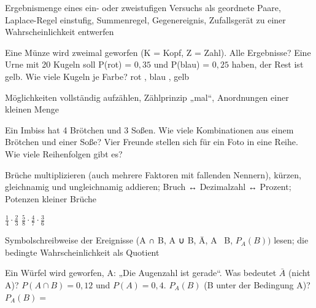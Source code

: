 \setcounter{aufgabe}{0}

\begin{aufgabe}{Ergebnismenge eines ein- oder zweistufigen Versuchs als geordnete Paare, Laplace-Regel einstufig, Summenregel, Gegenereignis, Zufallsgerät zu einer Wahrscheinlichkeit entwerfen}
\begin{teile}
\teil Eine Münze wird zweimal geworfen (K = Kopf, Z = Zahl). Alle Ergebnisse?
\teil Eine Urne mit 20 Kugeln soll P(rot) = $0{,}35$ und P(blau) = $0{,}25$ haben, der Rest ist gelb. Wie viele Kugeln je Farbe? rot \leerfeld, blau \leerfeld, gelb \leerfeld
\end{teile}
\end{aufgabe}

\begin{aufgabe}{Möglichkeiten vollständig aufzählen, Zählprinzip „mal“, Anordnungen einer kleinen Menge}
\begin{teile}
\teil Ein Imbiss hat 4 Brötchen und 3 Soßen. Wie viele Kombinationen aus einem Brötchen und einer Soße? \leerfeld
\teil Vier Freunde stellen sich für ein Foto in eine Reihe. Wie viele Reihenfolgen gibt es? \leerfeld
\end{teile}
\end{aufgabe}

\begin{aufgabe}{Brüche multiplizieren (auch mehrere Faktoren mit fallenden Nennern), kürzen, gleichnamig und ungleichnamig addieren; Bruch ↔ Dezimalzahl ↔ Prozent; Potenzen kleiner Brüche}
\begin{teile}
\teil $\frac{1}{4} \cdot \frac{2}{3}$ \leerfeld
\teil $\frac{5}{8} \cdot \frac{4}{7} \cdot \frac{3}{6}$ \leerfeld
\end{teile}
\end{aufgabe}

\begin{aufgabe}{Symbolschreibweise der Ereignisse (A ∩ B, A ∪ B, Ā, A \ B, $P_A(B))$ lesen; die bedingte Wahrscheinlichkeit als Quotient}
\begin{teile}
\teil Ein Würfel wird geworfen, A: „Die Augenzahl ist gerade“. Was bedeutet $\bar{A}$ (nicht A)?
\teil $P(A \cap B) = 0{,}12$ und $P(A) = 0{,}4$. $P_A(B)$ (B unter der Bedingung A)? $P_A(B) = $ \leerfeld
\end{teile}
\end{aufgabe}

